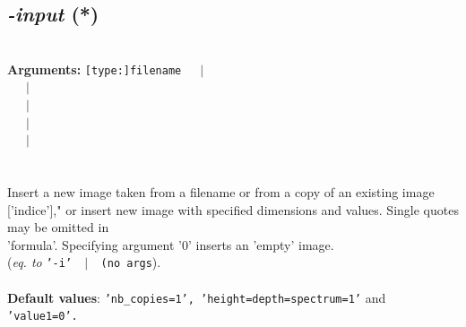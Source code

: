 \documentclass[a4paper,11pt,twoside]{book}
\begin{document}
\subsection{\emph{-input} (*)}\vspace*{-0.5em}
~\\\textbf{Arguments: } 
{\small \texttt{[type:]filename}}~~~$|$\\
~~~$|$\\
~~~$|$\\
~~~$|$\\
~~~$|$\\
\\~\\
Insert a new image taken from a filename or from a copy of an existing image ['indice'],"
or insert new image with specified dimensions and values. Single quotes may be omitted in
~\\'formula'. Specifying argument '0' inserts an 'empty' image.
~\\(\emph{eq. to} {\small \texttt{'-i' ~$|$~ (no args}}).
~\\~\\\textbf{Default values}: {\small \texttt{'nb\_copies=1', 'height=depth=spectrum=1'} and \texttt{'value1=0'.}}
\end{document}
